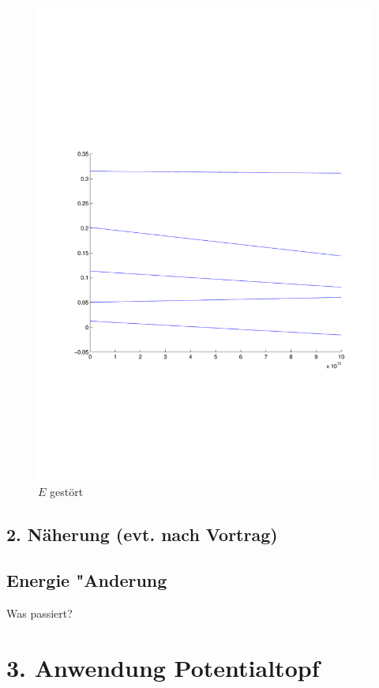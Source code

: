 \begin{refsection}
\begin{figure}
 \centering
 \includegraphics[width=12cm]{efeld/Energie_gestoert.pdf}
 \caption{$E$ gest\"ort}
 \label{abb:efeld_E_gestoert}
\end{figure}




\subsection{ 2. N\"aherung (evt. nach Vortrag) }

\subsection{ Energie "Anderung }

Was passiert?

\section{ 3. Anwendung Potentialtopf }


\end{refsection}
